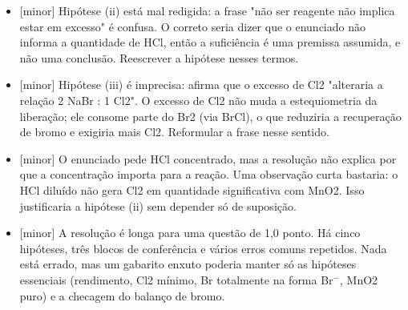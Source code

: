 \documentclass{article}%
\begin{document}
\begin{itemize}%
\item%
{[}minor{]} Hipótese (ii) está mal redigida: a frase "não ser reagente não implica estar em excesso" é confusa. O correto seria dizer que o enunciado não informa a quantidade de HCl, então a suficiência é uma premissa assumida, e não uma conclusão. Reescrever a hipótese nesses termos.%
\item%
{[}minor{]} Hipótese (iii) é imprecisa: afirma que o excesso de Cl2 "alteraria a relação 2 NaBr : 1 Cl2". O excesso de Cl2 não muda a estequiometria da liberação; ele consome parte do Br2 (via BrCl), o que reduziria a recuperação de bromo e exigiria mais Cl2. Reformular a frase nesse sentido.%
\item%
{[}minor{]} O enunciado pede HCl concentrado, mas a resolução não explica por que a concentração importa para a reação. Uma observação curta bastaria: o HCl diluído não gera Cl2 em quantidade significativa com MnO2. Isso justificaria a hipótese (ii) sem depender só de suposição.%
\item%
{[}minor{]} A resolução é longa para uma questão de 1,0 ponto. Há cinco hipóteses, três blocos de conferência e vários erros comuns repetidos. Nada está errado, mas um gabarito enxuto poderia manter só as hipóteses essenciais (rendimento, Cl2 mínimo, Br totalmente na forma Br$^{-}$, MnO2 puro) e a checagem do balanço de bromo.%
\end{itemize}%
\end{document}
